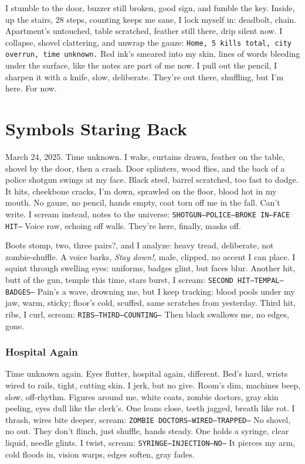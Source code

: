 \documentclass[12pt,oneside]{book} %
\newcommand{\note}[1]{\texttt{#1}}
\begin{document}
I stumble to the door, buzzer still broken, good sign, and fumble the key. Inside, up the stairs, 28 steps, counting keeps me sane, I lock myself in: deadbolt, chain. Apartment’s untouched, table scratched, feather still there, drip silent now. I collapse, shovel clattering, and unwrap the gauze: \note{Home, 5 kills total, city overrun, time unknown.} Red ink’s smeared into my skin, lines of words bleeding under the surface, like the notes are part of me now. I pull out the pencil, I sharpen it with a knife, slow, deliberate. They’re out there, shuffling, but I’m here. For now.

\chapter{Symbols Staring Back}

March 24, 2025. Time unknown. I wake, curtains drawn, feather on the table, shovel by the door, then a crash. Door splinters, wood flies, and the back of a police shotgun swings at my face. Black steel, barrel scratched, too fast to dodge. It hits, cheekbone cracks, I’m down, sprawled on the floor, blood hot in my mouth. No gauze, no pencil, hands empty, coat torn off me in the fall. Can’t write. I scream instead, notes to the universe: \note{SHOTGUN—POLICE—BROKE IN—FACE HIT—} Voice raw, echoing off walls. They’re here, finally, masks off.

Boots stomp, two, three pairs?, and I analyze: heavy tread, deliberate, not zombie-shuffle. A voice barks, \textit{Stay down!}, male, clipped, no accent I can place. I squint through swelling eyes: uniforms, badges glint, but faces blur. Another hit, butt of the gun, temple this time, stars burst, I scream: \note{SECOND HIT—TEMPAL—BADGES—} Pain’s a wave, drowning me, but I keep tracking: blood pools under my jaw, warm, sticky; floor’s cold, scuffed, same scratches from yesterday. Third hit, ribs, I curl, scream: \note{RIBS—THIRD—COUNTING—} Then black swallows me, no edges, gone.

\subsection*{Hospital Again}

Time unknown again. Eyes flutter, hospital again, different. Bed’s hard, wrists wired to rails, tight, cutting skin. I jerk, but no give. Room’s dim, machines beep, slow, off-rhythm. Figures around me, white coats, zombie doctors, gray skin peeling, eyes dull like the clerk’s. One leans close, teeth jagged, breath like rot. I thrash, wires bite deeper, scream: \note{ZOMBIE DOCTORS—WIRED—TRAPPED—} No shovel, no out. They don’t flinch, just shuffle, hands steady. One holds a syringe, clear liquid, needle glints. I twist, scream: \note{SYRINGE—INJECTION—NO—} It pierces my arm, cold floods in, vision warps, edges soften, gray fades.
\end{document}
